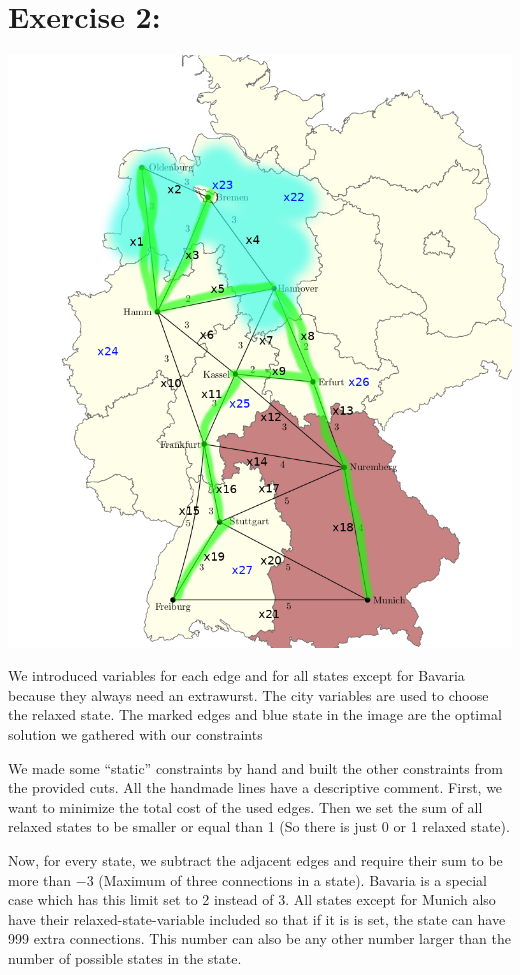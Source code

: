\documentclass{base}
\begin{document}
\section*{Exercise 2:}
\begin{center}
\includegraphics[scale=0.4]{de.png}
\end{center}

We introduced variables for each edge and for all states except for Bavaria because they always need an extrawurst.
The city variables are used to choose the relaxed state.
The marked edges and blue state in the image are the optimal solution we gathered with our constraints

We made some ``static'' constraints by hand and built the other constraints from the provided cuts.
All the handmade lines have a descriptive comment.
First, we want to minimize the total cost of the used edges.
Then we set the sum of all relaxed states to be smaller or equal than 1 (So there is just 0 or 1 relaxed state).

Now, for every state, we subtract the adjacent edges and require their sum to be more than $-3$ (Maximum of three connections in a state).
Bavaria is a special case which has this limit set to 2 instead of 3.
All states except for Munich also have their relaxed-state-variable included so that if it is is set, the state can have 999 extra connections. This number can also be any other number larger than the number of possible states in the state.
\end{document}
